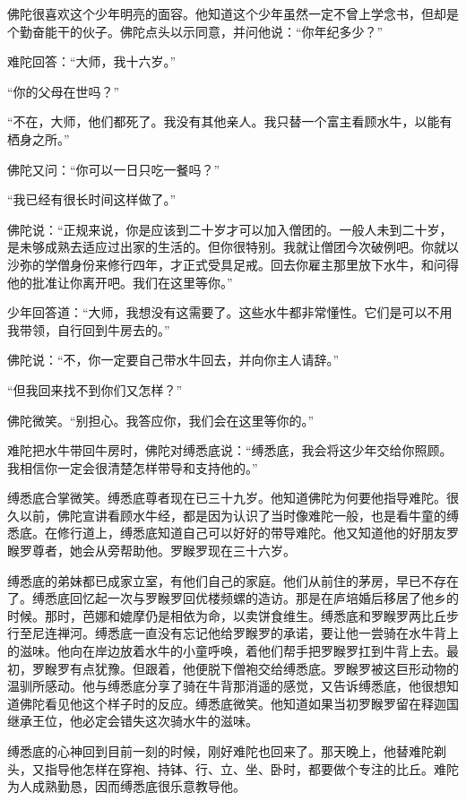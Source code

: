 \documentclass[12pt,twoside,openany]{book}
\begin{document}
佛陀很喜欢这个少年明亮的面容。他知道这个少年虽然一定不曾上学念书，但却是个勤奋能干的伙子。佛陀点头以示同意，并问他说：“你年纪多少？”

难陀回答：“大师，我十六岁。”

“你的父母在世吗？”

“不在，大师，他们都死了。我没有其他亲人。我只替一个富主看顾水牛，以能有栖身之所。”

佛陀又问：“你可以一日只吃一餐吗？”

“我已经有很长时间这样做了。”

佛陀说：“正规来说，你是应该到二十岁才可以加入僧团的。一般人未到二十岁，是未够成熟去适应过出家的生活的。但你很特别。我就让僧团今次破例吧。你就以沙弥的学僧身份来修行四年，才正式受具足戒。回去你雇主那里放下水牛，和问得他的批准让你离开吧。我们在这里等你。”

少年回答道：“大师，我想没有这需要了。这些水牛都非常懂性。它们是可以不用我带领，自行回到牛房去的。”

佛陀说：“不，你一定要自己带水牛回去，并向你主人请辞。”

“但我回来找不到你们又怎样？”

佛陀微笑。“别担心。我答应你，我们会在这里等你的。”

难陀把水牛带回牛房时，佛陀对缚悉底说：“缚悉底，我会将这少年交给你照顾。我相信你一定会很清楚怎样带导和支持他的。”

缚悉底合掌微笑。缚悉底尊者现在已三十九岁。他知道佛陀为何要他指导难陀。很久以前，佛陀宣讲看顾水牛经，都是因为认识了当时像难陀一般，也是看牛童的缚悉底。在修行道上，缚悉底知道自己可以好好的带导难陀。他又知道他的好朋友罗睺罗尊者，她会从旁帮助他。罗睺罗现在三十六岁。

缚悉底的弟妹都已成家立室，有他们自己的家庭。他们从前住的茅房，早已不存在了。缚悉底回忆起一次与罗睺罗回优楼频螺的造访。那是在庐培婚后移居了他乡的时候。那时，芭娜和媲摩仍是相依为命，以卖饼食维生。缚悉底和罗睺罗两比丘步行至尼连禅河。缚悉底一直没有忘记他给罗睺罗的承诺，要让他一尝骑在水牛背上的滋味。他向在岸边放着水牛的小童呼唤，着他们帮手把罗睺罗扛到牛背上去。最初，罗睺罗有点犹豫。但跟着，他便脱下僧袍交给缚悉底。罗睺罗被这巨形动物的温驯所感动。他与缚悉底分享了骑在牛背那消遥的感觉，又告诉缚悉底，他很想知道佛陀看见他这个样子时的反应。缚悉底微笑。他知道如果当初罗睺罗留在释迦国继承王位，他必定会错失这次骑水牛的滋味。

缚悉底的心神回到目前一刻的时候，刚好难陀也回来了。那天晚上，他替难陀剃头，又指导他怎样在穿袍、持钵、行、立、坐、卧时，都要做个专注的比丘。难陀为人成熟勤恳，因而缚悉底很乐意教导他。
\end{document}
